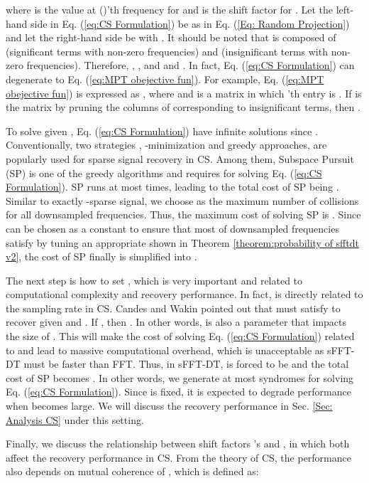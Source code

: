 \documentclass[journal,onecolumn,11pt]{IEEEtran}
\begin{document}
\normalsize
where  is the value at ()'th frequency for  and  is the shift factor for .
Let the left-hand side in Eq. (\ref{eq:CS Formulation}) be  as in Eq. (\ref{Eq: Random Projection}) and let the right-hand side be  with .
It should be noted that  is composed of  (significant terms with  non-zero frequencies) and  (insignificant terms with  non-zero frequencies).
Therefore, , , and  and .
In fact, Eq. (\ref{eq:CS Formulation}) can degenerate to Eq. (\ref{eq:MPT obejective fun}).
For example, Eq. (\ref{eq:MPT obejective fun}) is expressed as , where  and  is a matrix in which 'th entry is .
If  is the matrix by pruning the columns of  corresponding to insignificant terms, then .

To solve  given , Eq. (\ref{eq:CS Formulation}) have infinite solutions since .
Conventionally, two strategies \cite{Donoho2006}, -minimization and greedy approaches, are popularly used for sparse signal recovery in CS.
Among them, Subspace Pursuit (SP) \cite{Dai2009} is one of the greedy algorithms and requires  for solving Eq. (\ref{eq:CS Formulation}).
SP runs at most  times, leading to the total cost of SP being .
Similar to exactly -sparse signal, we choose  as the maximum number of collisions for all downsampled frequencies. Thus, the maximum cost of solving SP is .
Since  can be chosen as a constant to ensure that most of downsampled frequencies satisfy  by tuning an appropriate  shown in Theorem \ref{theorem:probability of sfftdt v2}, the cost of SP finally is simplified into .

The next step is how to set , which is very important and related to computational complexity and recovery performance.
In fact,  is directly related to the sampling rate in CS.
Candes and Wakin \cite{Candes2008} pointed out that   must satisfy  to recover  given  and .
If , then .
In other words,  is also a parameter that impacts the size of .
This will make the cost of solving Eq. (\ref{eq:CS Formulation}) related to  and lead to massive computational overhead, which is unacceptable as sFFT-DT must be faster than FFT.
Thus, in sFFT-DT,  is forced to be  and the total cost of SP becomes .
In other words, we generate at most  syndromes for solving Eq. (\ref{eq:CS Formulation}).
Since  is fixed, it is expected to degrade performance when  becomes large.
We will discuss the recovery performance in Sec. \ref{Sec: Analysis CS} under this setting.





Finally, we discuss the relationship between shift factors 's and , in which both affect the recovery performance in CS.
From the theory of CS, the performance also depends on mutual coherence of , which is defined as:
\small
\end{document}
